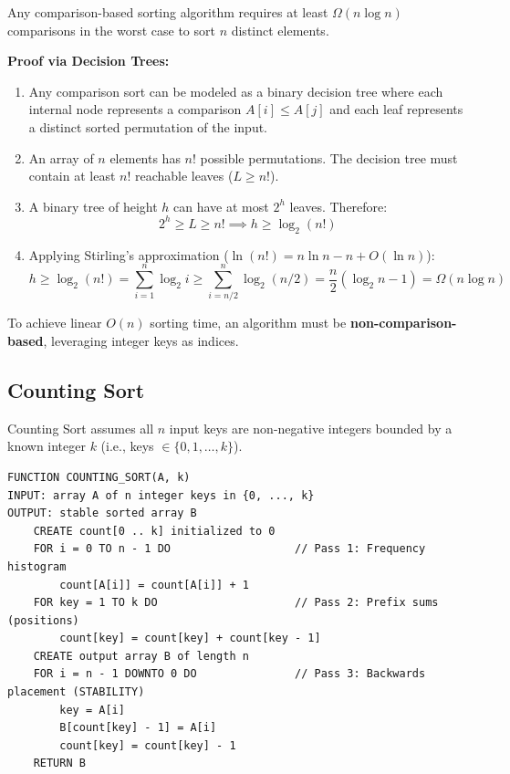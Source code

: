 \documentclass[11pt,a4paper]{article}
\begin{document}
\begin{theorembox}
Any comparison-based sorting algorithm requires at least $\Omega(n \log n)$ comparisons in the worst case to sort $n$ distinct elements.
\end{theorembox}
\textbf{Proof via Decision Trees:}
\begin{enumerate}[itemsep=2pt]
    \item Any comparison sort can be modeled as a binary decision tree where each internal node represents a comparison $A[i] \le A[j]$ and each leaf represents a distinct sorted permutation of the input.
    \item An array of $n$ elements has $n!$ possible permutations. The decision tree must contain at least $n!$ reachable leaves ($L \ge n!$).
    \item A binary tree of height $h$ can have at most $2^h$ leaves. Therefore:
    \[
    2^h \ge L \ge n! \implies h \ge \log_2(n!)
    \]
    \item Applying Stirling's approximation ($\ln(n!) = n \ln n - n + O(\ln n)$):
    \[
    h \ge \log_2(n!) = \sum_{i=1}^n \log_2 i \ge \sum_{i=n/2}^n \log_2(n/2) = \frac{n}{2} (\log_2 n - 1) = \Omega(n \log n)
    \]
\end{enumerate}
To achieve linear $O(n)$ sorting time, an algorithm must be \textbf{non-comparison-based}, leveraging integer keys as indices.

\subsection{Counting Sort}
Counting Sort assumes all $n$ input keys are non-negative integers bounded by a known integer $k$ (i.e., keys $\in \{0, 1, \dots, k\}$).

\begin{lstlisting}[style=pseudostyle]
FUNCTION COUNTING_SORT(A, k)
INPUT: array A of n integer keys in {0, ..., k}
OUTPUT: stable sorted array B
    CREATE count[0 .. k] initialized to 0
    FOR i = 0 TO n - 1 DO                   // Pass 1: Frequency histogram
        count[A[i]] = count[A[i]] + 1
    FOR key = 1 TO k DO                     // Pass 2: Prefix sums (positions)
        count[key] = count[key] + count[key - 1]
    CREATE output array B of length n
    FOR i = n - 1 DOWNTO 0 DO               // Pass 3: Backwards placement (STABILITY)
        key = A[i]
        B[count[key] - 1] = A[i]
        count[key] = count[key] - 1
    RETURN B
\end{lstlisting}
\end{document}
